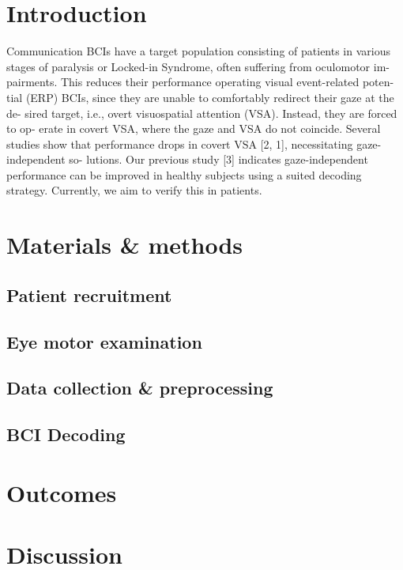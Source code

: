 \section{Introduction}

Communication BCIs have a target population consisting of patients in various
stages of paralysis or Locked-in Syndrome, often suffering from oculomotor im-
pairments. This reduces their performance operating visual event-related poten-
tial (ERP) BCIs, since they are unable to comfortably redirect their gaze at the de-
sired target, i.e., overt visuospatial attention (VSA). Instead, they are forced to op-
erate in covert VSA, where the gaze and VSA do not coincide. Several studies show
that performance drops in covert VSA [2, 1], necessitating gaze-independent so-
lutions. Our previous study [3] indicates gaze-independent performance can be
improved in healthy subjects using a suited decoding strategy. Currently, we aim
to verify this in patients.

\section{Materials \& methods}
\subsection{Patient recruitment}
\subsection{Eye motor examination}
\subsection{Data collection \& preprocessing}
\subsection{BCI Decoding}
\section{Outcomes}
\section{Discussion}
